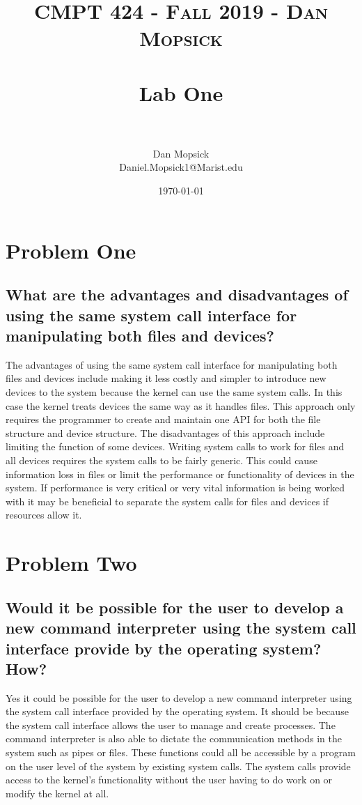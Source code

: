 \documentclass[letterpaper, 10pt,DIV=13]{scrartcl}
\title{	
   \normalfont \normalsize 
   \textsc{CMPT 424 - Fall 2019 - Dan Mopsick} \\[10pt] %
   \horrule{0.5pt} \\[0.25cm] 	%
   \huge Lab One  \\     	    %
   \horrule{0.5pt} \\[0.25cm] 	%
}
\author{Dan Mopsick \\ \normalsize Daniel.Mopsick1@Marist.edu}
\date{\normalsize\today} 	%
\numberwithin{equation}{section} %
\numberwithin{figure}{section} %
\numberwithin{table}{section} %
\begin{document}
\maketitle %

\section{Problem One}

\subsection{What	are	the	advantages	and	disadvantages	of	using	the	same	system	call	interface	
for	manipulating	both	files	and	devices?}


The advantages of using the same system call interface for manipulating both files and devices include making it less costly and simpler to introduce new devices to the system because the kernel can use the same system calls. In this case the kernel treats devices the same way as it handles files. This approach only requires the programmer to create and maintain one API for both the file structure and device structure. The disadvantages of this approach include limiting the function of some devices. Writing system calls to work for files and all devices requires the system calls to be fairly generic. This could cause information loss in files or limit the performance or functionality of devices in the system. If performance is very critical or very vital information is being worked with it may be beneficial to separate the system calls for files and devices if resources allow it.



\section{Problem Two}

\subsection{Would	it	be	possible	for	the	user	to	develop	a	new	command	interpreter	using	the	
system	call	interface	provide	by	the	operating	system?	How?}

Yes it could be possible for the user to develop a new command interpreter using the system call interface provided by the operating system. It should be because the system call interface allows the user to manage and create processes. The command interpreter is also able to dictate the communication methods in the system such as pipes or files. These functions could all be accessible by a program on the user level of the system by existing system calls. The system calls provide access to the kernel's functionality without the user having to do work on or modify the kernel at all.
\end{document}
